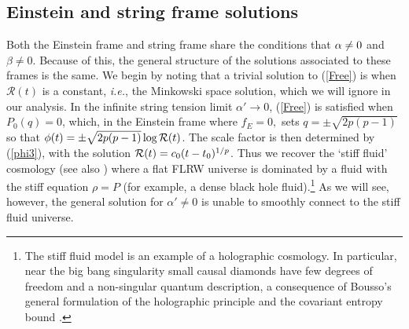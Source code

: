 \documentclass[amsmath,amssymb,11pt]{article}
\begin{document}
\subsection{Einstein and string frame solutions}

Both the Einstein frame and string frame share the conditions that $\alpha\neq 0$ and $\beta\neq 0.$ Because of this, the general structure of the solutions associated to these frames is the same. We begin by noting that a trivial solution to (\ref{Free}) is when $\mathcal{R}(t)$ is a constant, \emph{i.e.}, the Minkowski space solution, which we will ignore in our analysis.  In the infinite string tension limit $\alpha'\to0$, (\ref{Free}) is satisfied when $P_{0}(q)=0$,  which, in the Einstein frame where $f_E=0,$ sets $q=\pm\sqrt{2p(p-1)}$ so that $\phi(t)=\pm\sqrt{2p(p-1)}\log\mathcal{R}(t)$. The scale factor is then determined by (\ref{phi3}), with the solution $\mathcal{R}(t)=c_0(t-t_0)^{1/p}$. Thus we recover the `stiff fluid' cosmology \cite{Banks:2004cw,Banks:2004vg,Banks:2003ta} (see also \cite{Battefeld:2004jh}) where a flat FLRW universe is dominated by a fluid with the stiff equation $\rho=P$ (for example, a dense black hole fluid).\footnote{The stiff fluid model is an example of a holographic cosmology.  In particular, near the big bang singularity small causal diamonds have few degrees of freedom and a non-singular quantum description, a consequence of Bousso's general formulation of the holographic principle and the covariant entropy bound \cite{Bousso:1999cb}.} As we will see, however, the general solution for $\alpha'\neq0$ is unable to smoothly connect to the stiff fluid universe. 
\end{document}
